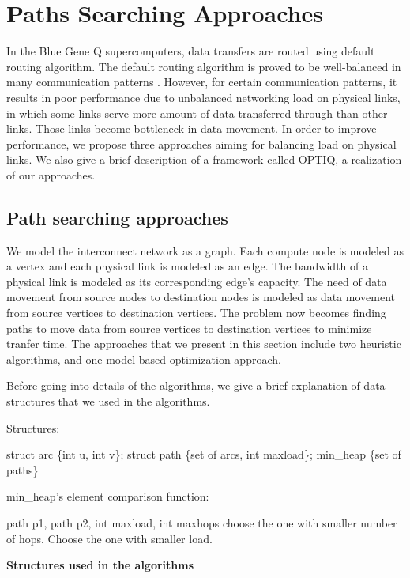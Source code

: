 \section{Paths Searching Approaches}
\label{sec:approach}

In the Blue Gene Q supercomputers, data transfers are routed using default routing algorithm. The default routing algorithm is proved to be well-balanced in many communication patterns \cite{Chen:BGQ}. However, for certain communication patterns, it results in poor performance due to unbalanced networking load on physical links, in which some links serve more amount of data transferred through than other links. Those links become bottleneck in data movement. In order to improve performance, we propose three approaches aiming for balancing load on physical links. We also give a brief description of a framework called OPTIQ, a realization of our approaches.

\subsection{Path searching approaches}

We model the interconnect network as a graph. Each compute node is modeled as a vertex and each physical link is modeled as an edge. The bandwidth of a physical link is modeled as its corresponding edge's capacity. The need of data movement from source nodes to destination nodes is modeled as data movement from source vertices to destination vertices. The problem now becomes finding paths to move data from source vertices to destination vertices to minimize tranfer time. The approaches that we present in this section include two heuristic algorithms, and one model-based optimization approach. 

Before going into details of the algorithms, we give a brief explanation of data structures that we used in the algorithms.

\begin{algorithm}[!htp]
Structures:
    \begin{algorithmic}
	\State struct arc \{int u, int v\};
	\State struct path \{set of arcs, int maxload\};
	\State min\_heap \{set of paths\}
    \end{algorithmic}

min\_heap's element comparison function:
    \begin{algorithmic}
         {path p1, path p2, int maxload, int maxhops}
                \State choose the one with smaller number of hops.
            \EndIf
                \State Choose the one with smaller load.
            \EndIf
        \EndFunction
    \end{algorithmic}

\caption*{\textbf{Structures used in the algorithms}}
\label{alg:struct1}

\end{algorithm}

